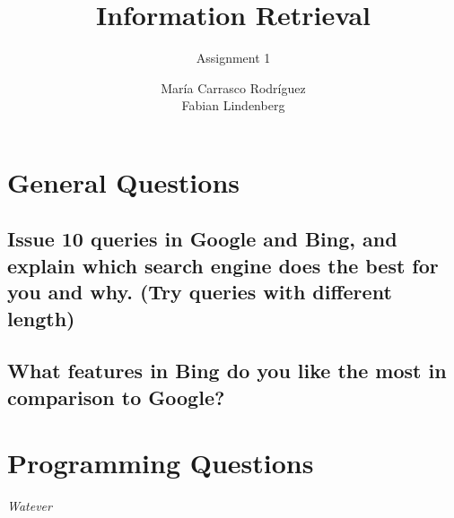 \documentclass[a4paper,11pt,oneside]{book}
\title{Information Retrieval }
\subtitle{Assignment 1}
\author{ María Carrasco Rodríguez \\
		Fabian Lindenberg}
\begin{document}
\kostspieligmaketitle

\tableofcontents
\pagebreak

\chapter{General Questions}
\section{ {\small Issue 10 queries in Google and Bing, and explain which search engine does the best for you and
why. (Try queries with different length)}}

\section{{\small What features in Bing do you like the most in comparison to Google?}}

\chapter{Programming Questions}

\pagebreak
\begin{thebibliography}{XXX}
 {\it Watever}


\end{thebibliography}
\end{document}
